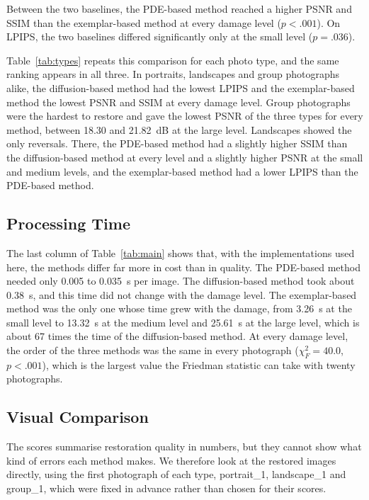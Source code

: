 \documentclass[conference]{IEEEtran}
\begin{document}
Between the two baselines, the PDE-based method reached a higher PSNR and SSIM than the exemplar-based method at every damage level ($p < .001$). On LPIPS, the two baselines differed significantly only at the small level ($p = .036$).

Table~\ref{tab:types} repeats this comparison for each photo type, and the same ranking appears in all three. In portraits, landscapes and group photographs alike, the diffusion-based method had the lowest LPIPS and the exemplar-based method the lowest PSNR and SSIM at every damage level. Group photographs were the hardest to restore and gave the lowest PSNR of the three types for every method, between 18.30 and 21.82~dB at the large level. Landscapes showed the only reversals. There, the PDE-based method had a slightly higher SSIM than the diffusion-based method at every level and a slightly higher PSNR at the small and medium levels, and the exemplar-based method had a lower LPIPS than the PDE-based method.

\subsection*{Processing Time}

The last column of Table~\ref{tab:main} shows that, with the implementations used here, the methods differ far more in cost than in quality. The PDE-based method needed only 0.005 to 0.035~s per image. The diffusion-based method took about 0.38~s, and this time did not change with the damage level. The exemplar-based method was the only one whose time grew with the damage, from 3.26~s at the small level to 13.32~s at the medium level and 25.61~s at the large level, which is about 67 times the time of the diffusion-based method. At every damage level, the order of the three methods was the same in every photograph ($\chi^2_F = 40.0$, $p < .001$), which is the largest value the Friedman statistic can take with twenty photographs.

\subsection*{Visual Comparison}

The scores summarise restoration quality in numbers, but they cannot show what kind of errors each method makes. We therefore look at the restored images directly, using the first photograph of each type, portrait\_1, landscape\_1 and group\_1, which were fixed in advance rather than chosen for their scores.
\end{document}

